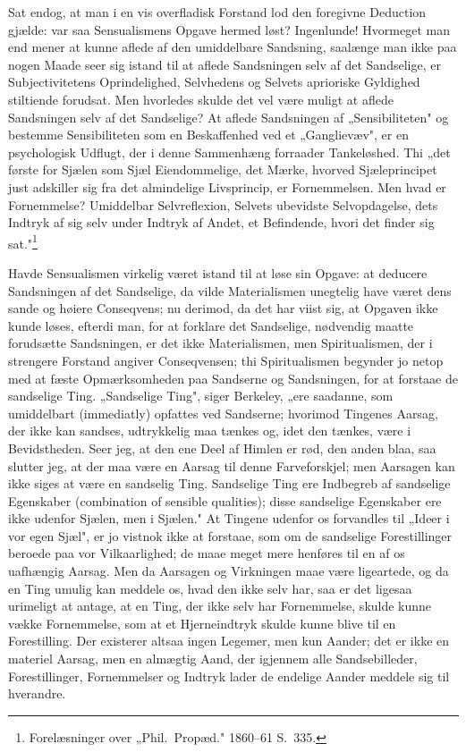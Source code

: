 \documentclass[12pt]{book}
\newcommand{\opage}[1]{\marginnote{\footnotesize\textit{[#1]}}}
\begin{document}
Sat endog, at man i en vis overfladisk Forstand lod den foregivne Deduction gjælde:
var saa Sensualismens Opgave hermed løst? Ingenlunde! Hvormeget man end mener at
kunne aflede af den umiddelbare Sandsning, saalænge man
\opage{28} ikke paa nogen Maade seer sig istand til at aflede Sandsningen selv af det
Sandselige, er Subjectivitetens Oprindelighed, Selvhedens og Selvets aprioriske
Gyldighed stiltiende forudsat. Men hvorledes skulde det vel være muligt at aflede
Sandsningen selv af det Sandselige? At aflede Sandsningen af „Sensibiliteten" og
bestemme Sensibiliteten som en Beskaffenhed ved et „Ganglievæv", er en psychologisk
Udflugt, der i denne Sammenhæng forraader Tankeløshed. Thi „det første for Sjælen
som Sjæl Eiendommelige, det Mærke, hvorved Sjæleprincipet just adskiller sig fra det
almindelige Livsprincip, er Fornemmelsen. Men hvad er Fornemmelse? Umiddelbar
Selvreflexion, Selvets ubevidste Selvopdagelse, dets Indtryk af sig selv under
Indtryk af Andet, et Befindende, hvori det finder sig sat."\footnote{Forelæsninger
over „Phil.\ Propæd." 1860--61 S.~335.}

Havde Sensualismen virkelig været istand til at løse sin Opgave: at deducere
Sandsningen af det Sandselige, da vilde Materialismen unegtelig have været dens sande
og høiere Conseqvens; nu derimod, da det har viist sig, at Opgaven ikke kunde løses,
efterdi man, for at forklare det Sandselige, nødvendig maatte forudsætte Sandsningen,
er det ikke Materialismen, men Spiritualismen, der i strengere Forstand angiver
Conseqvensen; thi Spiritualismen begynder jo netop med at fæste Opmærksomheden paa
Sandserne og Sandsningen, for at forstaae de sandselige Ting. „Sandselige Ting",
siger Berkeley, „ere saadanne, som umiddelbart (immediatly) opfattes ved Sandserne;
hvorimod Tingenes Aarsag, der ikke kan sandses, udtrykkelig maa tænkes og, idet den
tænkes, være i Bevidstheden. Seer jeg, at den ene Deel af Himlen er rød, den anden
blaa, saa slutter jeg, at der maa være en Aarsag til denne Farveforskjel; men
Aarsagen kan ikke siges at være en sandselig Ting. Sandselige Ting ere Indbegreb af
sandselige Egenskaber (combination of sensible qualities);
\opage{29} disse sandselige Egenskaber ere ikke udenfor Sjælen, men i Sjælen." At Tingene
udenfor os forvandles til „Ideer i vor egen Sjæl", er jo vistnok ikke at forstaae,
som om de sandselige Forestillinger beroede paa vor Vilkaarlighed; de maae meget mere
henføres til en af os uafhængig Aarsag. Men da Aarsagen og Virkningen maae være
ligeartede, og da en Ting umulig kan meddele os, hvad den ikke selv har, saa er det
ligesaa urimeligt at antage, at en Ting, der ikke selv har Fornemmelse, skulde kunne
vække Fornemmelse, som at et Hjerneindtryk skulde kunne blive til en Forestilling.
Der existerer altsaa ingen Legemer, men kun Aander; det er ikke en materiel Aarsag,
men en almægtig Aand, der igjennem alle Sandsebilleder, Forestillinger, Fornemmelser
og Indtryk lader de endelige Aander meddele sig til hverandre.
\end{document}
